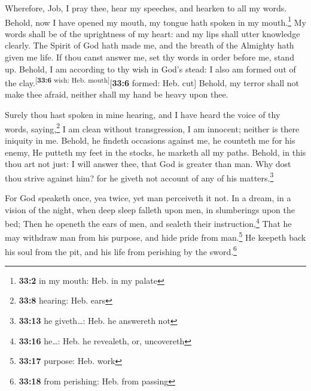  Wherefore, Job, I pray thee, hear my speeches, and
hearken to all my words.  Behold, now I have opened my
mouth, my tongue hath spoken in my mouth.\footnote{\textbf{33:2} in my
  mouth: Heb. in my palate}  My words shall be of the
uprightness of my heart: and my lips shall utter knowledge clearly.
 The Spirit of God hath made me, and the breath of the
Almighty hath given me life.  If thou canst answer me, set
thy words in order before me, stand up.  Behold, I am
according to thy wish in God's stead: I also am formed out of the
clay.\textsuperscript{{[}\textbf{33:6} wish: Heb.
mouth{]}}{[}\textbf{33:6} formed: Heb. cut{]}  Behold, my
terror shall not make thee afraid, neither shall my hand be heavy upon
thee.

 Surely thou hast spoken in mine hearing, and I have heard
the voice of thy words, saying,\footnote{\textbf{33:8} hearing: Heb.
  ears}  I am clean without transgression, I am innocent;
neither is there iniquity in me.  Behold, he findeth
occasions against me, he counteth me for his enemy,  He
putteth my feet in the stocks, he marketh all my paths. 
Behold, in this thou art not just: I will answer thee, that God is
greater than man.  Why dost thou strive against him? for
he giveth not account of any of his matters.\footnote{\textbf{33:13} he
  giveth\ldots: Heb. he answereth not}

 For God speaketh once, yea twice, yet man perceiveth it
not.  In a dream, in a vision of the night, when deep
sleep falleth upon men, in slumberings upon the bed; 
Then he openeth the ears of men, and sealeth their
instruction,\footnote{\textbf{33:16} he\ldots: Heb. he revealeth, or,
  uncovereth}  That he may withdraw man from his purpose,
and hide pride from man.\footnote{\textbf{33:17} purpose: Heb. work}
 He keepeth back his soul from the pit, and his life from
perishing by the sword.\footnote{\textbf{33:18} from perishing: Heb.
  from passing}

